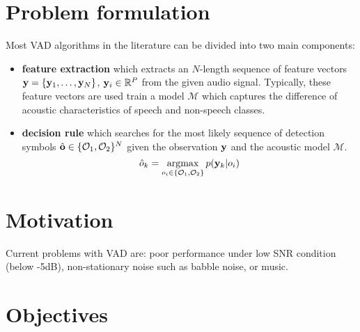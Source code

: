 \section{Problem formulation}
Most VAD algorithms in the literature can be divided into two main components:
\begin{itemize}
  \item \textbf{feature extraction} which extracts an $N$-length sequence of feature vectors $\mathbf{y}=\{\mathbf{y}_1,\dots,\mathbf{y}_N\}$, $\mathbf{y}_i \in \mathbb{R}^P$ from the given audio signal. Typically, these feature vectors are used train a model $\mathcal{M}$ which captures the difference of acoustic characteristics of speech and non-speech classes.
	\item \textbf{decision rule} which searches for the most likely sequence of detection symbols $\hat{\mathbf{o}}\in \{\mathcal{O}_1,\mathcal{O}_2\}^N$ given the observation $\mathbf{y}$ and the acoustic model $\mathcal{M}$.
      \begin{equation}
        \hat{o}_k = \operatorname*{argmax}_{o_i \in \{\mathcal{O}_1,\mathcal{O}_2\}} p(\mathbf{y}_k|o_i)
      \end{equation}
\end{itemize}


\section{Motivation}
Current problems with VAD are: poor performance under low SNR condition (below -5dB), non-stationary noise such as babble noise, or music.

\section{Objectives}
